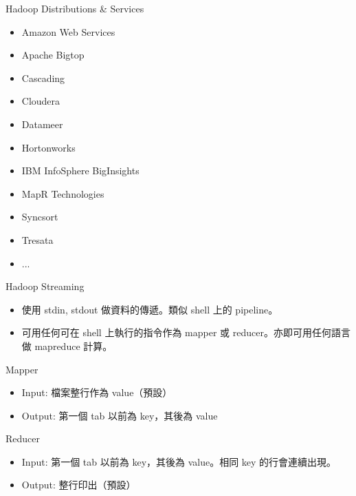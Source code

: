 \documentclass[12pt,c]{beamer}
\begin{document}
\begin{frame}{Hadoop Distributions \& Services}
  \href{http://wiki.apache.org/hadoop/Distributions\%20and\%20Commercial\%20Support}{}
  \begin{itemize}
\item Amazon Web Services
\item Apache Bigtop
\item Cascading 
\item Cloudera
\item Datameer
\item Hortonworks
\item IBM InfoSphere BigInsights
\item MapR Technologies
\item Syncsort
\item Tresata 
\item ...
  \end{itemize}
  
\end{frame}



\begin{frame}{Hadoop Streaming}
\begin{itemize}
  
\item 使用 stdin, stdout 做資料的傳遞。類似 shell 上的 pipeline。
\item 可用任何可在 shell 上執行的指令作為 mapper 或 reducer。亦即可用任何語言做 mapreduce 計算。

\end{itemize}  
 Mapper
  \begin{itemize}
  \item Input: 檔案整行作為 value（預設）
  \item Output: 第一個 tab 以前為 key，其後為 value
  \end{itemize}
  Reducer
  \begin{itemize}
  \item Input: 第一個 tab 以前為 key，其後為 value。相同 key 的行會連續出現。
  \item Output: 整行印出（預設）
  \end{itemize}
\end{frame}
\end{document}
